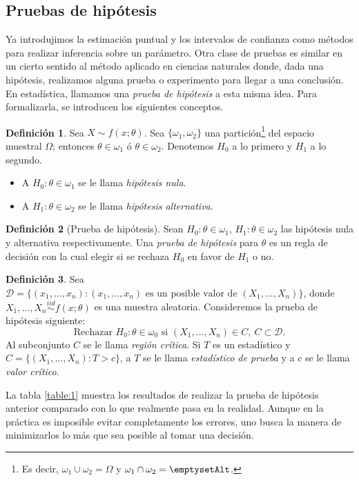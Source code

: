 \documentclass[11pt,letterpaper]{article}
\theoremstyle{definition}
\newtheorem{definition}{Definición}[section]
\theoremstyle{theorem}
\theoremstyle{remark}
\begin{document}
	\subsection{Pruebas de hipótesis}
	\noindent\justify Ya introdujimos la estimación puntual y los intervalos de confianza como métodos para realizar inferencia sobre un parámetro. Otra clase de pruebas es similar en un cierto sentido al método aplicado en ciencias naturales donde, dada una hipótesis, realizamos alguna prueba o experimento para llegar a una conclusión. En estadística, llamamos una \textit{prueba de hipótesis} a esta misma idea. Para formalizarla, se introducen los siguientes conceptos.
	\begin{definition}
		Sea \(X\sim f(x;\theta)\). Sea \(\{\omega_1,\omega_2\}\) una partición\footnote{Es decir, \(\omega_1\cup\omega_2=\Omega\) y \(\omega_1\cap\omega_2=\emptysetAlt\).} del espacio muestral \(\Omega\); entonces \(\theta\in \omega_1\) ó \(\theta\in\omega_2\). Denotemos \(H_0\) a lo primero y \(H_1\) a lo segundo.
		\begin{itemize}
			\item A \(H_0:\theta\in\omega_1\) se le llama \textit{hipótesis nula}.
			\item A \(H_1:\theta\in\omega_2\) se le llama \textit{hipótesis alternativa}.
		\end{itemize}
	\end{definition}
	\begin{definition}[Prueba de hipótesis]
		Sean \(H_0:\theta\in\omega_1\), \(H_1:\theta\in\omega_2\) las hipótesis nula y alternativa respectivamente. Una \textit{prueba de hipótesis} para \(\theta\) es un regla de decisión con la cual elegir si se rechaza \(H_0 \) en favor de \(H_1\) o no.
	\end{definition}
	\begin{definition}
		Sea \(\mathcal{D}=\{(x_1,\dots,x_n):(x_1,\dots,x_n)\mbox{ es un posible valor de }(X_1,\dots,X_n)\}\), donde \(X_1,\dots,X_n\overset{iid}{\sim}f(x;\theta)\) es una muestra aleatoria. Consideremos la prueba de hipótesis siguiente: \[\mbox{Rechazar }H_0:\theta\in\omega_0\mbox{ si }(X_1,\dots,X_n)\in C,\ C\subset\mathcal{D}.\]
		Al subconjunto \(C\) se le llama \textit{región crítica}. Si \(T\) es un estadístico y \(C=\{(X_1,\dots,X_n):T>c\}\), a \(T\) se le llama \textit{estadístico de prueba} y a \(c\) se le llama \textit{valor crítico}.
	\end{definition}
	La tabla \ref{table:1} muestra los resultados de realizar la prueba de hipótesis anterior comparado con lo que realmente pasa en la realidad. Aunque en la práctica es imposible evitar completamente los errores, uno busca la manera de minimizarlos lo más que sea posible al tomar una decisión.
\end{document}

